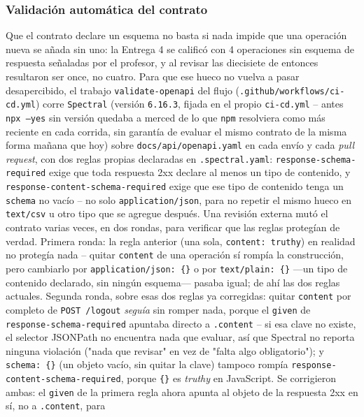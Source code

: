 \subsubsection{Validación automática del contrato}
\label{sec:validacion-contrato}

Que el contrato declare un esquema no basta si nada impide que una operación nueva se añada sin
uno: la Entrega 4 se calificó con 4 operaciones sin esquema de respuesta señaladas por el
profesor, y al revisar las diecisiete de entonces resultaron ser once, no cuatro. Para que ese
hueco no vuelva a pasar desapercibido, el trabajo \texttt{validate-openapi} del flujo
(\texttt{.github/workflows/ci-cd.yml}) corre \texttt{Spectral} (versión \texttt{6.16.3}, fijada
en el propio \texttt{ci-cd.yml} -- antes \texttt{npx --yes} sin versión quedaba a merced de lo
que \texttt{npm} resolviera como más reciente en cada corrida, sin garantía de evaluar el mismo
contrato de la misma forma mañana que hoy) sobre
\texttt{docs/api/openapi.yaml} en cada envío y cada \emph{pull request}, con dos reglas propias
declaradas en \texttt{.spectral.yaml}: \texttt{response-schema-required} exige que toda
respuesta 2xx declare al menos un tipo de contenido, y \texttt{response-content-schema-required}
exige que ese tipo de contenido tenga un \texttt{schema} no vacío -- no solo
\texttt{application/json}, para no repetir el mismo hueco en \texttt{text/csv} u otro tipo que
se agregue después. Una revisión externa mutó el contrato varias veces, en dos rondas, para verificar que las reglas
protegían de verdad. Primera ronda: la regla anterior (una sola, \texttt{content: truthy}) en
realidad no protegía nada -- quitar \texttt{content} de una operación sí rompía la construcción,
pero cambiarlo por \texttt{application/json: \{\}} o por \texttt{text/plain: \{\}} —un tipo de
contenido declarado, sin ningún esquema— pasaba igual; de ahí las dos reglas actuales.
Segunda ronda, sobre esas dos reglas ya corregidas: quitar \texttt{content} por completo de
\texttt{POST /logout} \emph{seguía} sin romper nada, porque el \texttt{given} de
\texttt{response-schema-required} apuntaba directo a \texttt{.content} -- si esa clave no existe,
el selector JSONPath no encuentra nada que evaluar, así que Spectral no reporta ninguna
violación ("nada que revisar" en vez de "falta algo obligatorio"); y \texttt{schema: \{\}} (un
objeto vacío, sin quitar la clave) tampoco rompía \texttt{response-content-schema-required},
porque \texttt{\{\}} es \emph{truthy} en JavaScript. Se corrigieron ambas: el \texttt{given} de
la primera regla ahora apunta al objeto de la respuesta 2xx en sí, no a \texttt{.content}, para

